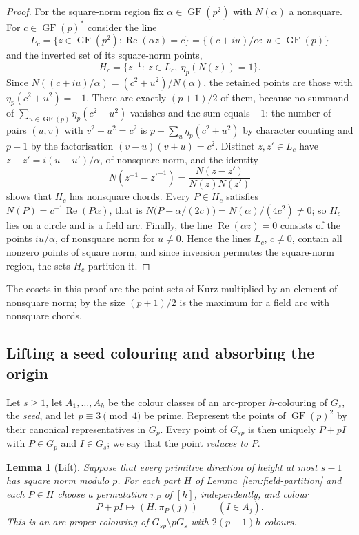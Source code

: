 \documentclass[11pt]{article}
\newtheorem{lemma}[theorem]{Lemma}
\theoremstyle{definition}
\theoremstyle{remark}
\newcommand{\GF}{\operatorname{GF}}
\newcommand{\qc}{\eta_p}
\renewcommand{\ge}{\geqslant}
\begin{document}
\begin{proof}
For the square-norm region fix \(\alpha\in\GF(p^2)\) with \(N(\alpha)\) a
nonsquare.  For \(c\in\GF(p)^*\) consider the line
\[
  L_c=\{z\in\GF(p^2):\operatorname{Re}(\alpha z)=c\}
     =\{(c+iu)/\alpha:\ u\in\GF(p)\}
\]
and the inverted set of its square-norm points,
\[
  H_c=\{z^{-1}:\ z\in L_c,\ \qc(N(z))=1\}.
\]
Since \(N((c+iu)/\alpha)=(c^2+u^2)/N(\alpha)\), the retained points are
those with \(\qc(c^2+u^2)=-1\).  There are exactly \((p+1)/2\) of them,
because no summand of \(\sum_{u\in\GF(p)}\qc(c^2+u^2)\) vanishes and the
sum equals \(-1\): the number of pairs \((u,v)\) with \(v^2-u^2=c^2\) is
\(p+\sum_u\qc(c^2+u^2)\) by character counting and \(p-1\) by the
factorisation \((v-u)(v+u)=c^2\).  Distinct \(z,z'\in L_c\) have
\(z-z'=i(u-u')/\alpha\), of nonsquare norm, and the identity
\begin{equation}\label{eq:inversion}
  N(z^{-1}-z'^{-1})=\frac{N(z-z')}{N(z)N(z')}
\end{equation}
shows that \(H_c\) has nonsquare chords.  Every \(P\in H_c\) satisfies
\(N(P)=c^{-1}\operatorname{Re}(P\bar\alpha)\), that is
\(N\bigl(P-\alpha/(2c)\bigr)=N(\alpha)/(4c^2)\ne0\); so \(H_c\) lies on
a circle and is a field arc.  Finally, the line
\(\operatorname{Re}(\alpha z)=0\) consists of the points \(iu/\alpha\),
of nonsquare norm for \(u\ne0\).  Hence the lines \(L_c\), \(c\ne0\),
contain all nonzero points of square norm, and since inversion permutes
the square-norm region, the sets \(H_c\) partition it.
\end{proof}

The cosets in this proof are the point sets of Kurz
\cite[Lemma~26]{Kurz2009} multiplied by an element of nonsquare norm; by
\cite[Corollary~4]{Kurz2009} the size \((p+1)/2\) is the maximum for a
field arc with nonsquare chords.

\subsection{Lifting a seed colouring and absorbing the origin}
\label{sec:lift-absorb}

Let \(s\ge1\), let \(A_1,\ldots,A_h\) be the colour classes of an
arc-proper \(h\)-colouring of \(G_s\), the \emph{seed}, and let
\(p\equiv3\pmod4\) be prime.  Represent the points of \(\GF(p)^2\) by
their canonical representatives in \(G_p\).  Every point of \(G_{sp}\) is
then uniquely \(P+pI\) with \(P\in G_p\) and \(I\in G_s\); we say that the
point \emph{reduces to} \(P\).

\begin{lemma}[Lift]\label{lem:lift}
Suppose that every primitive direction of height at most \(s-1\) has
square norm modulo \(p\).  For each part \(H\) of
Lemma~\ref{lem:field-partition} and each \(P\in H\) choose a permutation
\(\pi_P\) of \([h]\), independently, and colour
\begin{equation}\label{eq:lift-colour}
  P+pI\longmapsto (H,\pi_P(j))\qquad(I\in A_j).
\end{equation}
This is an arc-proper colouring of \(G_{sp}\setminus pG_s\) with
\(2(p-1)h\) colours.
\end{lemma}
\end{document}
